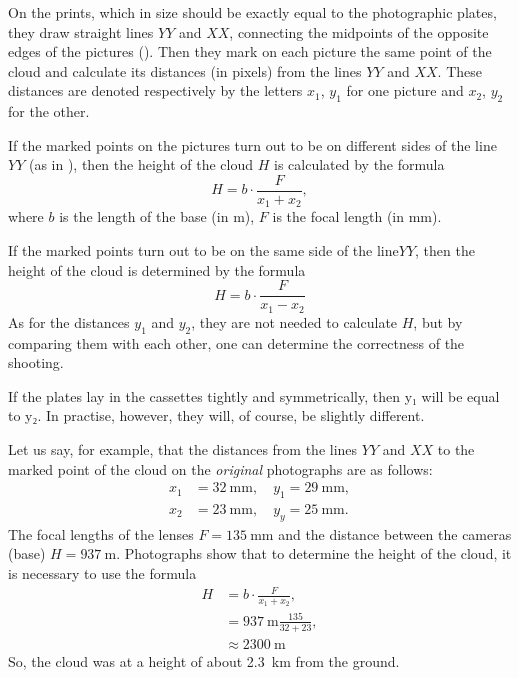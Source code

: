 On the prints, which in size should be exactly equal to the photographic plates, they draw straight lines $YY$ and $XX$, connecting the midpoints of the opposite edges of the pictures (). Then they mark on each picture the same point of the cloud and calculate its distances (in pixels) from the lines $YY$ and $XX$. These distances are denoted respectively by the letters $x_{1}$, $y_{1}$ for one picture and $x_{2}$, $y_{2}$ for the other.

If the marked points on the pictures turn out to be on different sides of the line $YY$ (as in ), then the height of the cloud $H$ is calculated by the formula
\begin{equation*}%
H = b \cdot \frac{F}{x_{1} + x_{2}},
\end{equation*}	
where $b$ is the length of the base (in \si{\meter}), $F$ is the focal length (in \si{\milli\meter}).

If the marked points turn out to be on the same side of the line$YY$, then the height of the cloud is determined by the formula
\begin{equation*}%
H = b \cdot \frac{F}{x_{1} - x_{2}}
\end{equation*}	
As for the distances $y_{1}$ and $y_{2}$, they are not needed to calculate $H$, but by comparing them with each other, one can determine the correctness of the shooting.

If the plates lay in the cassettes tightly and symmetrically, then y₁ will be equal to y₂. In practise, however, they will, of course, be slightly different.

Let us say, for example, that the distances from the lines $YY$ and $XX$ to the marked point of the cloud on the \emph{original} photographs are as follows:
\begin{align*}%
x_{1} & = \SI{32}{\milli\meter},\quad  y_{1} = \SI{29}{\milli\meter},\\
x_{2} & = \SI{23}{\milli\meter},\quad  y_{y} = \SI{25}{\milli\meter}.
\end{align*}
The focal lengths of the lenses $F = \SI{135}{\milli\meter}$ and the distance between the cameras (base) $H = \SI{937}{\meter}$. Photographs show that to determine the height of the cloud, it is necessary to use the formula
\begin{align*}%
H & = b \cdot \frac{F}{x_{1} + x_{2}},\\
& =  \SI{937}{\meter} \frac{135}{32 + 23},\\
& \approx \SI{2300}{\meter}
\end{align*}	
So, the cloud was at a height of about \SI{2.3}{\kilo\meter} from the ground.

